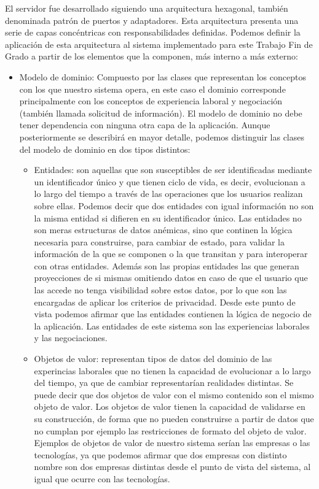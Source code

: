\documentclass[a4paper, 12pt]{book}
\begin{document}
El servidor fue desarrollado siguiendo una arquitectura hexagonal, también denominada patrón de puertos y adaptadores. Esta arquitectura presenta una serie de capas concéntricas con responsabilidades definidas.
Podemos definir la aplicación de esta arquitectura al sistema implementado para este Trabajo Fin de Grado a partir de los elementos que la componen, más interno a más externo:

\begin{itemize}
\item Modelo de dominio: Compuesto por las clases que representan los conceptos con los que nuestro sistema opera, en este caso el dominio corresponde principalmente con los conceptos de experiencia laboral y negociación (también llamada solicitud de información).
El modelo de dominio no debe tener dependencia con ninguna otra capa de la aplicación.
Aunque posteriormente se describirá en mayor detalle, podemos distinguir las clases del modelo de dominio en dos tipos distintos:

	\begin{itemize}
	 \item Entidades: son aquellas que son susceptibles de ser identificadas mediante un identificador único y que tienen ciclo de vida, es decir, evolucionan a lo largo del tiempo a través de las operaciones que los usuarios realizan sobre ellas.
	Podemos decir que dos entidades con igual información no son la misma entidad si difieren en su identificador único.
	Las entidades no son meras estructuras de datos anémicas, sino que continen la lógica necesaria para construirse, para cambiar de estado, para validar la información de la que se componen o la que transitan y para interoperar con otras entidades.
	Además son las propias entidades las que generan proyecciones de si mismas omitiendo datos en caso de que el usuario que las accede no tenga visibilidad sobre estos datos, por lo que son las encargadas de aplicar los criterios de privacidad.
	Desde este punto de vista podemos afirmar que las entidades contienen la lógica de negocio de la aplicación.
	Las entidades de este sistema son las experiencias laborales y las negociaciones.
	\item Objetos de valor: representan tipos de datos del dominio de las experincias laborales que no tienen la capacidad de evolucionar a lo largo del tiempo, ya que de cambiar representarían realidades distintas. Se puede decir que dos objetos de valor con el mismo contenido son el mismo objeto de valor.
	Los objetos de valor tienen la capacidad de validarse en su construcción, de forma que no pueden construirse a partir de datos que no cumplan por ejemplo las restricciones de formato del objeto de valor.
	Ejemplos de objetos de valor de nuestro sistema serían las empresas o las tecnologías, ya que podemos afirmar que dos empresas con distinto nombre son dos empresas distintas desde el punto de vista del sistema, al igual que ocurre con las tecnologías.
	\end{itemize}


\end{itemize}
\end{document}
